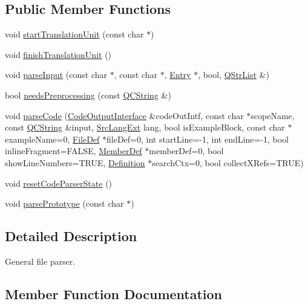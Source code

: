 \subsection*{Public Member Functions}
\begin{DoxyCompactItemize}
\item 
void \mbox{\hyperlink{class_file_parser_a4a8fa3af665adaca443c02ddd3d13d7d}{start\+Translation\+Unit}} (const char $\ast$)
\item 
void \mbox{\hyperlink{class_file_parser_a08ab809441600d2ace9508c040bc3943}{finish\+Translation\+Unit}} ()
\item 
void \mbox{\hyperlink{class_file_parser_a129994a05caded4f7bfe5d30945f008b}{parse\+Input}} (const char $\ast$, const char $\ast$, \mbox{\hyperlink{class_entry}{Entry}} $\ast$, bool, \mbox{\hyperlink{class_q_str_list}{Q\+Str\+List}} \&)
\item 
bool \mbox{\hyperlink{class_file_parser_acf9bb5f92915a547a6638a07e63b9100}{needs\+Preprocessing}} (const \mbox{\hyperlink{class_q_c_string}{Q\+C\+String}} \&)
\item 
void \mbox{\hyperlink{class_file_parser_aa9db12f7a11ecbd929a1998fc4ef3b3c}{parse\+Code}} (\mbox{\hyperlink{class_code_output_interface}{Code\+Output\+Interface}} \&code\+Out\+Intf, const char $\ast$scope\+Name, const \mbox{\hyperlink{class_q_c_string}{Q\+C\+String}} \&input, \mbox{\hyperlink{types_8h_a9974623ce72fc23df5d64426b9178bf2}{Src\+Lang\+Ext}} lang, bool is\+Example\+Block, const char $\ast$example\+Name=0, \mbox{\hyperlink{class_file_def}{File\+Def}} $\ast$file\+Def=0, int start\+Line=-\/1, int end\+Line=-\/1, bool inline\+Fragment=F\+A\+L\+SE, \mbox{\hyperlink{class_member_def}{Member\+Def}} $\ast$member\+Def=0, bool show\+Line\+Numbers=T\+R\+UE, \mbox{\hyperlink{class_definition}{Definition}} $\ast$search\+Ctx=0, bool collect\+X\+Refs=T\+R\+UE)
\item 
void \mbox{\hyperlink{class_file_parser_af8af94eb387a7ed046f52bc36d2f615a}{reset\+Code\+Parser\+State}} ()
\item 
void \mbox{\hyperlink{class_file_parser_a810fbf1258dcc4d4d87711499a7f7454}{parse\+Prototype}} (const char $\ast$)
\end{DoxyCompactItemize}


\subsection{Detailed Description}
General file parser. 

\subsection{Member Function Documentation}
\mbox{\label{class_file_parser_a08ab809441600d2ace9508c040bc3943}} 
